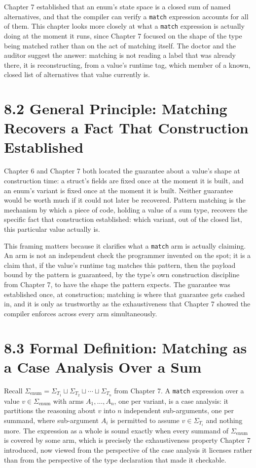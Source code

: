 \documentclass[11pt]{book}
\begin{document}
Chapter 7 established that an enum's state space is a closed sum of named alternatives, and that the compiler can verify a \texttt{match} expression accounts for all of them. This chapter looks more closely at what a \texttt{match} expression is actually doing at the moment it runs, since Chapter 7 focused on the shape of the type being matched rather than on the act of matching itself. The doctor and the auditor suggest the answer: matching is not reading a label that was already there, it is reconstructing, from a value's runtime tag, which member of a known, closed list of alternatives that value currently is.

\section*{8.2 General Principle: Matching Recovers a Fact That Construction Established}

Chapter 6 and Chapter 7 both located the guarantee about a value's shape at construction time: a struct's fields are fixed once at the moment it is built, and an enum's variant is fixed once at the moment it is built. Neither guarantee would be worth much if it could not later be recovered. Pattern matching is the mechanism by which a piece of code, holding a value of a sum type, recovers the specific fact that construction established: which variant, out of the closed list, this particular value actually is.

This framing matters because it clarifies what a \texttt{match} arm is actually claiming. An arm is not an independent check the programmer invented on the spot; it is a claim that, if the value's runtime tag matches this pattern, then the payload bound by the pattern is guaranteed, by the type's own construction discipline from Chapter 7, to have the shape the pattern expects. The guarantee was established once, at construction; matching is where that guarantee gets cashed in, and it is only as trustworthy as the exhaustiveness that Chapter 7 showed the compiler enforces across every arm simultaneously.

\section*{8.3 Formal Definition: Matching as a Case Analysis Over a Sum}

Recall $\Sigma_{\text{enum}} = \Sigma_{T_1} \sqcup \Sigma_{T_2} \sqcup \cdots \sqcup \Sigma_{T_n}$ from Chapter 7. A \texttt{match} expression over a value $v \in \Sigma_{\text{enum}}$ with arms $A_1, \ldots, A_n$, one per variant, is a case analysis: it partitions the reasoning about $v$ into $n$ independent sub-arguments, one per summand, where sub-argument $A_i$ is permitted to assume $v \in \Sigma_{T_i}$ and nothing more. The expression as a whole is sound exactly when every summand of $\Sigma_{\text{enum}}$ is covered by some arm, which is precisely the exhaustiveness property Chapter 7 introduced, now viewed from the perspective of the case analysis it licenses rather than from the perspective of the type declaration that made it checkable.
\end{document}
